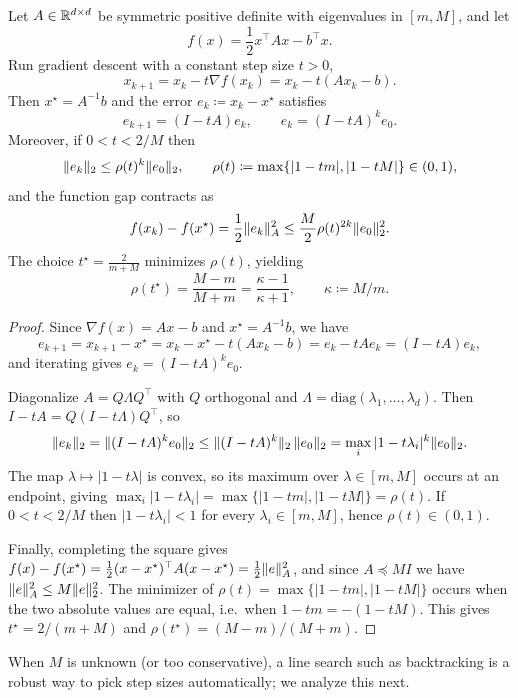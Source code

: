 \begin{proposition}
\label{prop:gd-quadratic}
Let $A\in\mathbb{R}^{d\times d}$ be symmetric positive definite with eigenvalues in $[m,M]$, and let
\[
f(x)=\frac12 x^\top A x - b^\top x.
\]
Run gradient descent with a constant step size $t>0$,
\[
x_{k+1}=x_k - t\nabla f(x_k)=x_k - t(Ax_k-b).
\]
Then $x^\star=A^{-1}b$ and the error $e_k\coloneqq x_k-x^\star$ satisfies
\[
e_{k+1}=(I-tA)e_k,
\qquad
e_k=(I-tA)^k e_0.
\]
Moreover, if $0<t<2/M$ then
\[
\lVert e_k\rVert_2 \le \rho(t)^k \lVert e_0\rVert_2,
\qquad
\rho(t) \coloneqq \max\{|1-tm|,|1-tM|\}\in(0,1),
\]
and the function gap contracts as
\[
f(x_k)-f(x^\star)=\frac12\lVert e_k\rVert_A^2 \le \frac{M}{2}\rho(t)^{2k}\lVert e_0\rVert_2^2.
\]
The choice $t^\star=\frac{2}{m+M}$ minimizes $\rho(t)$, yielding
\[
\rho(t^\star)=\frac{M-m}{M+m} = \frac{\kappa-1}{\kappa+1},
\qquad \kappa\coloneqq M/m.
\]
\end{proposition}
\begin{proof}
Since $\nabla f(x)=Ax-b$ and $x^\star=A^{-1}b$, we have
\[
e_{k+1}=x_{k+1}-x^\star = x_k-x^\star - t(Ax_k-b) = e_k - tAe_k = (I-tA)e_k,
\]
and iterating gives $e_k=(I-tA)^k e_0$.

Diagonalize $A=Q\Lambda Q^\top$ with $Q$ orthogonal and $\Lambda=\mathrm{diag}(\lambda_1,\dots,\lambda_d)$.
Then $I-tA = Q(I-t\Lambda)Q^\top$, so
\[
\lVert e_k\rVert_2 = \lVert(I-tA)^k e_0\rVert_2
\le \lVert(I-tA)^k\rVert_2\,\lVert e_0\rVert_2
= \max_i |1-t\lambda_i|^k \lVert e_0\rVert_2.
\]
The map $\lambda\mapsto |1-t\lambda|$ is convex, so its maximum over $\lambda\in[m,M]$ occurs at an endpoint, giving
$\max_i |1-t\lambda_i| = \max\{|1-tm|,|1-tM|\} = \rho(t)$.
If $0<t<2/M$ then $|1-t\lambda_i|<1$ for every $\lambda_i\in[m,M]$, hence $\rho(t)\in(0,1)$.

Finally, completing the square gives
$f(x)-f(x^\star)=\frac12 (x-x^\star)^\top A (x-x^\star)=\frac12\lVert e\rVert_A^2$,
and since $A\preceq MI$ we have $\lVert e\rVert_A^2 \le M\lVert e\rVert_2^2$.
The minimizer of $\rho(t)=\max\{|1-tm|,|1-tM|\}$ occurs when the two absolute values are equal, i.e.\ when $1-tm=-(1-tM)$.
This gives $t^\star=2/(m+M)$ and $\rho(t^\star)=(M-m)/(M+m)$.
\end{proof}

When $M$ is unknown (or too conservative), a line search such as backtracking is a robust way to pick step sizes automatically; we analyze this next.
